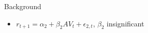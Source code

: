 \documentclass{beamer}
\begin{document}
\begin{frame}{Background}
\begin{itemize}[<+->]
\begin{itemize}[<+->]
			\item $r_{t+1} = \alpha_{2} + \beta_{2}AV_{t} + \epsilon_{2,t}$, $\beta_{2}$ insignificant 
		\end{itemize}
	\end{itemize}
\end{frame}

\end{document}
